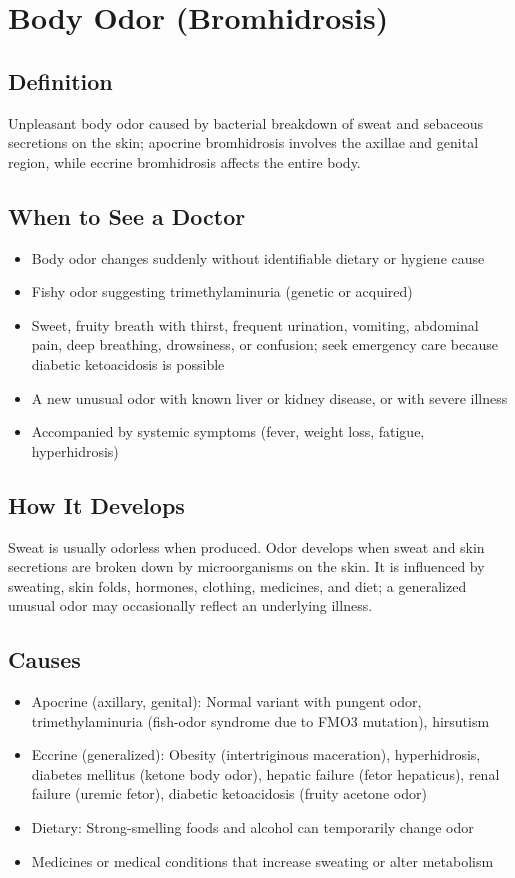 \chapter{Body Odor (Bromhidrosis)}

\section*{Definition}
Unpleasant body odor caused by bacterial breakdown of sweat and sebaceous secretions on the skin; apocrine bromhidrosis involves the axillae and genital region, while eccrine bromhidrosis affects the entire body.

\section*{When to See a Doctor}

\begin{itemize}
 \item Body odor changes suddenly without identifiable dietary or hygiene cause
 \item Fishy odor suggesting trimethylaminuria (genetic or acquired)
 \item Sweet, fruity breath with thirst, frequent urination, vomiting, abdominal pain, deep breathing, drowsiness, or confusion; seek emergency care because diabetic ketoacidosis is possible
 \item A new unusual odor with known liver or kidney disease, or with severe illness
 \item Accompanied by systemic symptoms (fever, weight loss, fatigue, hyperhidrosis)
\end{itemize}

\section*{How It Develops}
Sweat is usually odorless when produced. Odor develops when sweat and skin secretions are broken down by microorganisms on the skin. It is influenced by sweating, skin folds, hormones, clothing, medicines, and diet; a generalized unusual odor may occasionally reflect an underlying illness.

\section*{Causes}
\begin{itemize}
 \item Apocrine (axillary, genital): Normal variant with pungent odor, trimethylaminuria (fish-odor syndrome due to FMO3 mutation), hirsutism
 \item Eccrine (generalized): Obesity (intertriginous maceration), hyperhidrosis, diabetes mellitus (ketone body odor), hepatic failure (fetor hepaticus), renal failure (uremic fetor), diabetic ketoacidosis (fruity acetone odor)
 \item Dietary: Strong-smelling foods and alcohol can temporarily change odor
 \item Medicines or medical conditions that increase sweating or alter metabolism
\end{itemize}

